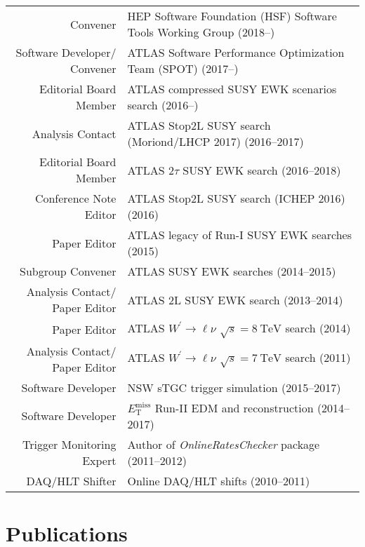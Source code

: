 \documentclass[a4paper,10pt]{article}
\begin{document}
\begin{tabular}{r | p{12cm}}
\multicolumn{1}{r|}{Convener}					& HEP Software Foundation (HSF) Software Tools Working Group \hfill (2018--\phantom{0000})				\\
\multicolumn{1}{r|}{Software Developer/ Convener}	& ATLAS Software Performance Optimization Team (SPOT) \hfill (2017--\phantom{0000})				\\
\multicolumn{1}{r|}{Editorial Board Member}		& ATLAS compressed SUSY EWK scenarios search \hfill (2016--\phantom{0000})				\\
\multicolumn{1}{r|}{Analysis Contact}				& ATLAS Stop2L SUSY search (Moriond/LHCP 2017)  \hfill (2016--2017)					\\
\multicolumn{1}{r|}{Editorial Board Member}		& ATLAS 2$\tau$ SUSY EWK search \hfill (2016--2018)				\\
\multicolumn{1}{r|}{Conference Note Editor}		& ATLAS Stop2L SUSY search (ICHEP 2016) \hfill (2016)					\\
\multicolumn{1}{r|}{Paper Editor}				& ATLAS legacy of Run-I SUSY EWK searches \hfill (2015) 		\\ 
\multicolumn{1}{r|}{Subgroup Convener}			& ATLAS SUSY EWK searches \hfill (2014--2015)				\\
\multicolumn{1}{r|}{Analysis Contact/ Paper Editor}	& ATLAS 2L SUSY EWK search \hfill (2013--2014)				\\
\multicolumn{1}{r|}{Paper Editor}				& ATLAS $W^{\prime}\rightarrow\ell\nu$ $\sqrt{s} = 8\ \mathrm{TeV}$  search \hfill (2014)		\\
\multicolumn{1}{r|}{Analysis Contact/ Paper Editor}	& ATLAS $W^{\prime}\rightarrow\ell\nu$ $\sqrt{s} = 7\ \mathrm{TeV}$ search \hfill (2011)		\\
\multicolumn{1}{r|}{Software Developer}			& NSW sTGC trigger simulation \hfill (2015--2017)	\\
\multicolumn{1}{r|}{Software Developer}			& $E_{\mathrm{T}}^{\mathrm{miss}}$ Run-II EDM and reconstruction \hfill (2014--2017)	\\
\multicolumn{1}{r|}{Trigger Monitoring Expert}		& Author of {\it OnlineRatesChecker} package \hfill (2011--2012)	\\
\multicolumn{1}{r|}{DAQ/HLT Shifter}				& Online DAQ/HLT shifts	\hfill (2010--2011)					\\
\end{tabular}

\vspace{3mm}
\section{Publications}
\end{document}
